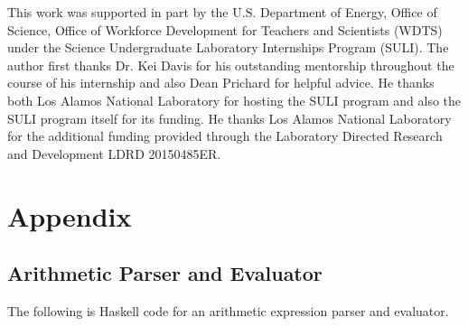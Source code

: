\documentclass[11pt]{article}
\begin{document}
This work was supported in part by the U.S. Department of Energy, Office of
Science, Office of Workforce Development for Teachers and Scientists (WDTS)
under the Science Undergraduate Laboratory Internships Program (SULI). The
author first thanks Dr. Kei Davis for his outstanding mentorship throughout
the course of his internship and also Dean Prichard for helpful advice. He thanks
both Los Alamos National Laboratory for hosting the SULI program and also the SULI
program itself for its funding. He thanks Los Alamos National Laboratory for the additional funding provided through the Laboratory Directed Research and Development LDRD 20150485ER. 
\section{Appendix}

\subsection{Arithmetic Parser and Evaluator}

The following is Haskell code for an arithmetic expression parser and evaluator. 
\end{document}
